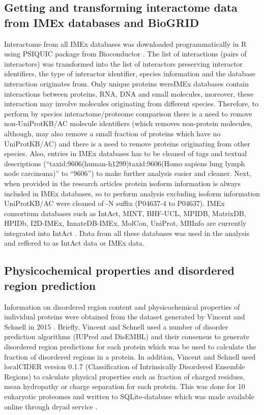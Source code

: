 \documentclass[12pt,]{report}
\begin{document}
\subsection{Getting and transforming interactome data from IMEx
databases and
BioGRID}\label{getting-and-transforming-interactome-data-from-imex-databases-and-biogrid}

Interactome from all IMEx databases was downloaded programmatically in R
using PSIQUIC package from Bioconductor \citep{PSICQUIC}. The list of
interactions (pairs of interactors) was transformed into the list of
interactors preserving interactor identifiers, the type of interactor
identifier, species information and the database interaction originates
from. Only unique proteins wereIMEx databases contain interactions
between proteins, RNA, DNA and small molecules, moreover, these
interaction may involve molecules originating from different species.
Therefore, to perform by species interactome/proteome comparison there
is a need to remove non-UniProtKB/AC molecule identifiers (which removes
non-protein molecules, although, may also remove a small fraction of
proteins which have no UniProtKB/AC) and there is a need to remove
proteins originating from other species. Also, entries in IMEx databases
has to be cleaned of tags and textual descriptions
(``taxid:9606(human-h1299)\textbar{}taxid:9606(Homo sapiens lung lymph
node carcinoma)'' to ``9606'') to make further analysis easier and
cleaner. Next, when provided in the research articles protein isoform
information is always included in IMEx databases, so to perform analysis
excluding isoform information UniProtKB/AC were cleaned of -N suffix
(P04637-4 to P04637). IMEx consortium databases such as IntAct, MINT,
BHF-UCL, MPIDB, MatrixDB, HPIDb, I2D-IMEx, InnateDB-IMEx, MolCon,
UniProt, MBInfo are currently integrated into IntAct
\citep{Orchard:2014aa}. Data from all these databases was used in the
analysis and reffered to as IntAct data or IMEx data.

\subsection{Physicochemical properties and disordered region
prediction}\label{physicochemical-properties-and-disordered-region-prediction}

Information on disordered region content and physicochemical properties
of individual proteins were obtained from the dataset generated by
Vincent and Schnell in 2015 \citep{Vincent:2016aa}. Briefly, Vincent and
Schnell used a number of disorder prediction algorithms (IUPred and
DisEMBL) and their consensus to generate disordered region predictions
for each protein which was be used to calculate the fraction of
disordered regions in a protein. In addition, Vincent and Schnell used
localCIDER version 0.1.7 (Classification of Intrinsically Disordered
Ensemble Regions) to calculate physical properties such as fraction of
charged residues, mean hydropathy or charge separation for each protein.
This was done for 10 eukaryotic proteomes and written to SQLite-database
which was made available online through dryad service
\citep{dryad_sm107}.
\end{document}
